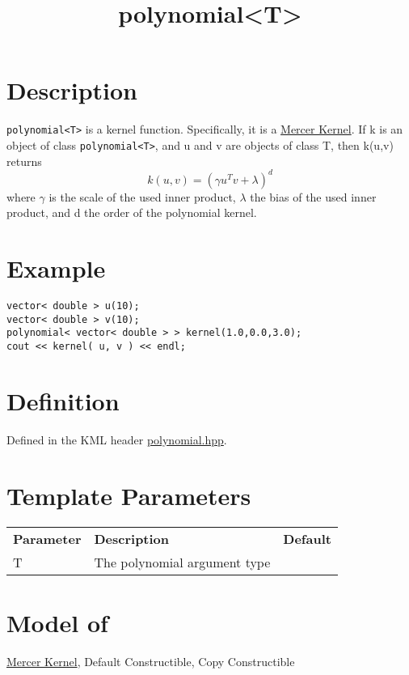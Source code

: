 \documentclass{article}
\begin{document}
\title{polynomial<T>}
\maketitle

\section*{Description}

\texttt{polynomial<T>} is a kernel function. Specifically, it is a \href{research/kml/documentation/mercer_kernel.html}{Mercer Kernel}.
 If k is an object of class \texttt{polynomial<T>}, and u and v are objects of class T, then k(u,v) returns
%
$$k(u,v) = (\gamma u^T v + \lambda)^d$$
%
where $\gamma$ is the scale of the used inner product, $\lambda$ the bias of the used inner product, and d the order of the polynomial kernel.


\section*{Example}


\highlightcpp{}
\begin{verbatim}
vector< double > u(10);
vector< double > v(10);
polynomial< vector< double > > kernel(1.0,0.0,3.0);
cout << kernel( u, v ) << endl;
\end{verbatim}


\section*{Definition}

Defined in the KML header \href{polynomial.hpp}{polynomial.hpp}.


\section*{Template Parameters}

\begin{tabular}{lll}
\textbf{Parameter} & \textbf{Description} & \textbf{Default} \\ 
T & The polynomial argument type \\ 
\end{tabular}


\section*{Model of}

\href{research/kml/documentation/mercer_kernel.html}{Mercer Kernel}, 
Default Constructible, Copy Constructible
\end{document}
